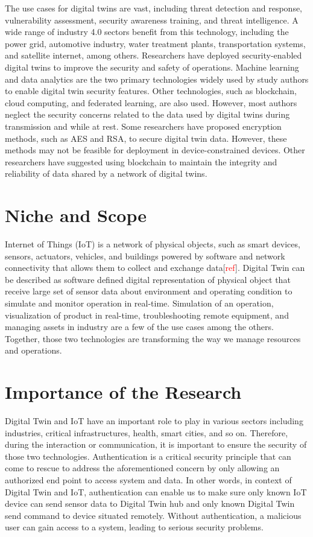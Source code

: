 The use cases for digital twins are vast, including threat detection and response, vulnerability assessment, security awareness training, and threat intelligence. A wide range of industry 4.0 sectors benefit from this technology, including the power grid, automotive industry, water treatment plants, transportation systems, and satellite internet, among others. Researchers have deployed security-enabled digital twins to improve the security and safety of operations.  
Machine learning and data analytics are the two primary technologies widely used by study authors to enable digital twin security features. Other technologies, such as blockchain, cloud computing, and federated learning, are also used. However, most authors neglect the security concerns related to the data used by digital twins during transmission and while at rest.  
Some researchers have proposed encryption methods, such as AES and RSA, to secure digital twin data. However, these methods may not be feasible for deployment in device-constrained devices. Other researchers have suggested using blockchain to maintain the integrity and reliability of data shared by a network of digital twins.  

\section{Niche and Scope}
Internet of Things (IoT) is a network of physical objects, such as smart devices, sensors, actuators, vehicles, and buildings powered by software and network connectivity that allows them to collect and exchange data[\textcolor{red}{ref}]. Digital Twin can be described as software defined digital representation of physical object that receive large set of sensor data about environment and operating condition to simulate and monitor operation in real-time\cite{williamdanilczykANGELIntelligentDigital2019, danilczykSmartGridAnomaly2021}. Simulation of an operation, visualization of product in real-time, troubleshooting remote equipment, and managing assets in industry are a few of the use cases among the others. Together, those two technologies are transforming the way we manage resources and operations. 

\section{Importance of the Research}
Digital Twin and IoT have an important role to play in various sectors including industries, critical infrastructures, health, smart cities, and so on. Therefore, during the interaction or communication, it is important to ensure the security of those two technologies. Authentication is a critical security principle that can come to rescue to address the aforementioned concern by only allowing an authorized end point to access system and data. In other words, in context of Digital Twin and IoT, authentication can enable us to make sure only known IoT device can send sensor data to Digital Twin hub and only known Digital Twin send command to device situated remotely. Without authentication, a malicious user can gain access to a system, leading to serious security problems. 

